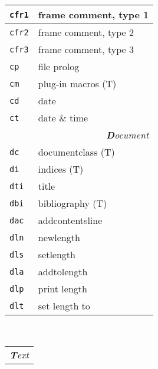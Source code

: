 \documentclass[oneside,10pt,landscape,DIV16]{scrartcl}
\newcommand{\Map}[1] {\textbf{\textasciiacute}\texttt{#1}}
\begin{document}
\begin{multicols}{3}
\begin{center}
\begin{tabular}[]{|p{11mm}|p{60mm}|}
%
\hline     \Map{cfr1} & frame comment, type 1       \\
\hline     \Map{cfr2} & frame comment, type 2       \\
\hline     \Map{cfr3} & frame comment, type 3       \\
\hline     \Map{cp}   & file prolog                 \\
\hline     \Map{cm}   & plug-in macros              \hfill (T)\\
\hline     \Map{cd}   & date                        \\
\hline     \Map{ct}   & date \& time                \\
\hline
\hline
\multicolumn{2}{|r|}{\textsl{\textbf{D}ocument}}                 \\[1.0ex]
\hline     \Map{dc}  &  documentclass               \hfill (T)\\
\hline     \Map{di}  &  indices                     \hfill (T)\\
\hline     \Map{dti} &  title                       \\
\hline     \Map{dbi} &  bibliography                \hfill (T)\\
\hline     \Map{dac} &  addcontentsline             \\
\hline
\hline     \Map{dln} &  newlength                   \\
\hline     \Map{dls} &  setlength                   \\
\hline     \Map{dla} &  addtolength                 \\
\hline     \Map{dlp} &  print length                \\
\hline     \Map{dlt} &  set length to               \\
\hline
%
\end{tabular}\\
%
\begin{tabular}[]{|p{11mm}|p{60mm}|}
\hline
\multicolumn{2}{|r|}{\textsl{\textbf{T}ext}}                 \\[1.0ex]

\end{tabular}
\end{center}
\end{multicols}
\end{document}
